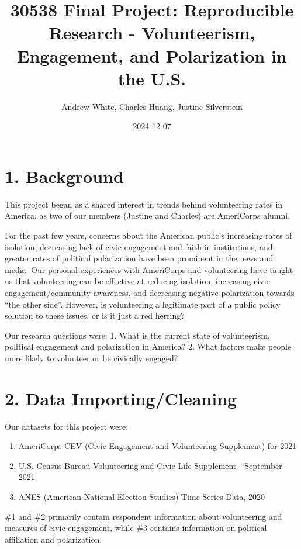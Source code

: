 \documentclass[
  letterpaper,
  DIV=11,
  numbers=noendperiod]{scrartcl}
\title{30538 Final Project: Reproducible Research - Volunteerism,
Engagement, and Polarization in the U.S.}
\author{Andrew White, Charles Huang, Justine Silverstein}
\date{2024-12-07}
\providecommand{\tightlist}{%
  \setlength{\itemsep}{0pt}\setlength{\parskip}{0pt}}\usepackage{longtable,booktabs,array}
\begin{document}
\maketitle


\section{1. Background}\label{background}

This project began as a shared interest in trends behind volunteering
rates in America, as two of our members (Justine and Charles) are
AmeriCorps alumni.

For the past few years, concerns about the American public's increasing
rates of isolation, decreasing lack of civic engagement and faith in
institutions, and greater rates of political polarization have been
prominent in the news and media. Our personal experiences with
AmeriCorps and volunteering have taught us that volunteering can be
effective at reducing isolation, increasing civic engagement/community
awareness, and decreasing negative polarization towards ``the other
side''. However, is volunteering a legitimate part of a public policy
solution to these issues, or is it just a red herring?

Our research questions were: 1. What is the current state of
volunteerism, political engagement and polarization in America? 2. What
factors make people more likely to volunteer or be civically engaged?

\section{2. Data Importing/Cleaning}\label{data-importingcleaning}

Our datasets for this project were:

\begin{enumerate}
\def\labelenumi{\arabic{enumi}.}
\tightlist
\item
  AmeriCorps CEV (Civic Engagement and Volunteering Supplement) for 2021
\item
  U.S. Census Bureau Volunteering and Civic Life Supplement - September
  2021
\item
  ANES (American National Election Studies) Time Series Data, 2020
\end{enumerate}

\#1 and \#2 primarily contain respondent information about volunteering
and measures of civic engagement, while \#3 contains information on
political affiliation and polarization.
\end{document}
